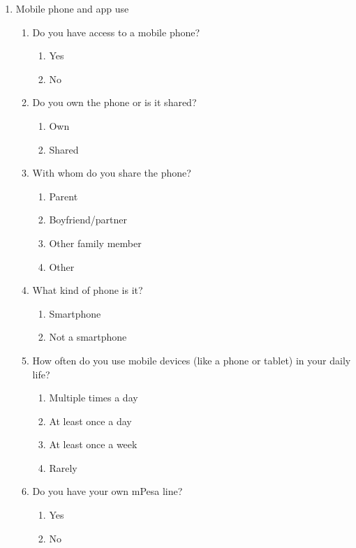 \begin{enumerate}
    \item Mobile phone and app use
    \begin{enumerate}
        \item Do you have access to a mobile phone?
            \begin{enumerate}
                \item Yes
                \item No
            \end{enumerate}            
        \item Do you own the phone or is it shared?
            \begin{enumerate}
                \item Own
                \item Shared
            \end{enumerate}  
        \item With whom do you share the phone?
        \begin{enumerate}
            \item Parent
            \item Boyfriend/partner
            \item Other family member
            \item Other
        \end{enumerate}
        \item What kind of phone is it?
            \begin{enumerate}
                \item Smartphone
                \item Not a smartphone
            \end{enumerate}  
        \item How often do you use mobile devices (like a phone or tablet) in your daily life?
        \begin{enumerate}
            \item Multiple times a day
            \item At least once a day
            \item At least once a week
            \item Rarely
        \end{enumerate}
        \item Do you have your own mPesa line?
            \begin{enumerate}
                \item Yes
                \item No

\end{enumerate}
\end{enumerate}
\end{enumerate}
